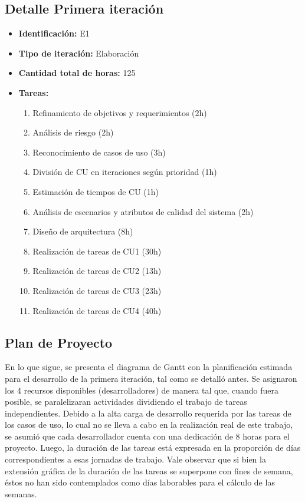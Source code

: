 \documentclass[a4paper, 10pt, twoside]{article}
\begin{document}
\subsection{Detalle Primera iteración}
\begin{itemize}
	\item \textbf{Identificación:} E1
	\item \textbf{Tipo de iteración:} Elaboración
	\item \textbf{Cantidad total de horas:} 125
	\item \textbf{Tareas:}
\begin{enumerate}
	\item Refinamiento de objetivos y requerimientos (2h)
	\item Análisis de riesgo (2h)
	\item Reconocimiento de casos de uso (3h)
	\item División de CU en iteraciones según prioridad (1h)
	\item Estimación de tiempos de CU (1h)
	\item Análisis de escenarios y atributos de calidad del sistema (2h)
	\item Diseño de arquitectura (8h)
	\item Realización de tareas de CU1 (30h)
	\item Realización de tareas de CU2 (13h)
	\item Realización de tareas de CU3 (23h)
	\item Realización de tareas de CU4 (40h)
\end{enumerate}
\end{itemize}

\subsection{Plan de Proyecto}
En lo que sigue, se presenta el diagrama de Gantt con la planificación estimada para el desarrollo de la primera iteración, tal como se detalló antes. Se asignaron los 4 recursos disponibles (desarrolladores) de manera tal que, cuando fuera posible, se paralelizaran actividades dividiendo el trabajo de tareas independientes. Debido a la alta carga de desarrollo requerida por las tareas de los casos de uso, lo cual no se lleva a cabo en la realización real de este trabajo, se asumió que cada desarrollador cuenta con una dedicación de 8 horas para el proyecto. Luego, la duración de las tareas está expresada en la proporción de días correspondientes a esas jornadas de trabajo. Vale observar que si bien la extensión gráfica de la duración de las tareas se superpone con fines de semana, éstos no han sido contemplados como días laborables para el cálculo de las semanas.
\newpage
\end{document}
